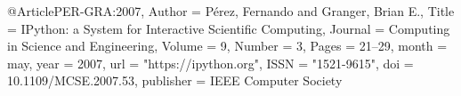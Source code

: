 @Article{PER-GRA:2007, 
 Author    = {P\'erez, Fernando and Granger, Brian E.}, 
 Title     = {{IP}ython: a System for Interactive Scientific Computing}, 
 Journal   = {Computing in Science and Engineering}, 
 Volume    = {9}, 
 Number    = {3}, 
 Pages     = {21--29}, 
 month     = may, 
 year      = 2007, 
 url       = "https://ipython.org", 
 ISSN      = "1521-9615", 
 doi       = {10.1109/MCSE.2007.53}, 
 publisher = {IEEE Computer Society} }


